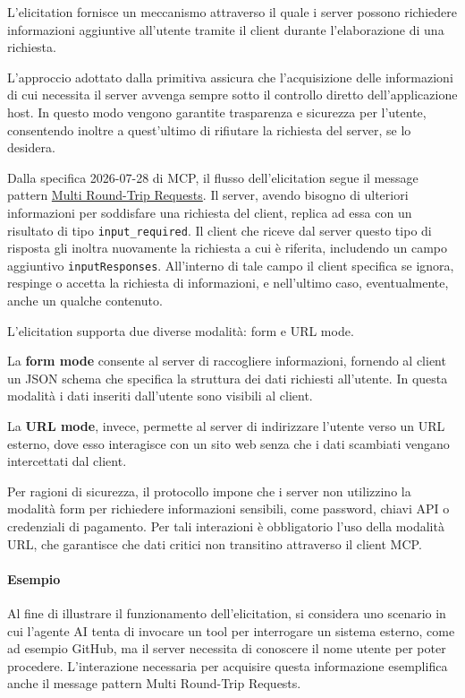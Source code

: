 L'elicitation fornisce un meccanismo attraverso il quale i server
possono richiedere informazioni aggiuntive all'utente tramite il client
durante l'elaborazione di una richiesta.

L'approccio adottato dalla primitiva assicura che l'acquisizione delle
informazioni di cui necessita il server avvenga sempre sotto il
controllo diretto dell'applicazione host. In questo modo vengono
garantite trasparenza e sicurezza per l'utente, consentendo inoltre a
quest'ultimo di rifiutare la richiesta del server, se lo desidera.

Dalla specifica 2026-07-28 di MCP, il flusso dell’elicitation segue
il message pattern \hyperref[i-pattern-di-messaggi]{Multi Round-Trip Requests}. 
Il server, avendo bisogno di ulteriori informazioni per soddisfare una 
richiesta del client, replica ad essa con un risultato di tipo \texttt{input\_required}.
Il client che riceve dal server questo tipo di risposta gli inoltra
nuovamente la richiesta a cui è riferita, includendo un campo aggiuntivo
\texttt{inputResponses}. All’interno di tale campo il client specifica se ignora,
respinge o accetta la richiesta di informazioni, e nell’ultimo caso, 
eventualmente, anche un qualche contenuto.


L'elicitation supporta due diverse modalità: form e URL mode.

La \textbf{form mode} consente al server di raccogliere informazioni,
fornendo al client un JSON schema che specifica la struttura dei dati
richiesti all'utente. In questa modalità i dati inseriti dall'utente
sono visibili al client.

La \textbf{URL mode}, invece, permette al server di indirizzare l'utente
verso un URL esterno, dove esso interagisce con un sito web senza che i
dati scambiati vengano intercettati dal client.

Per ragioni di sicurezza, il protocollo impone che i server non
utilizzino la modalità form per richiedere informazioni sensibili, come
password, chiavi API o credenziali di pagamento. Per tali interazioni è
obbligatorio l'uso della modalità URL, che garantisce che dati critici
non transitino attraverso il client MCP.

\paragraph{Esempio}\label{esempio-elicitation}

Al fine di illustrare il funzionamento dell'elicitation, si considera
uno scenario in cui l'agente AI tenta di invocare un tool per
interrogare un sistema esterno, come ad esempio GitHub, ma il server
necessita di conoscere il nome utente per poter procedere. L'interazione
necessaria per acquisire questa informazione esemplifica anche il
message pattern Multi Round-Trip Requests.

